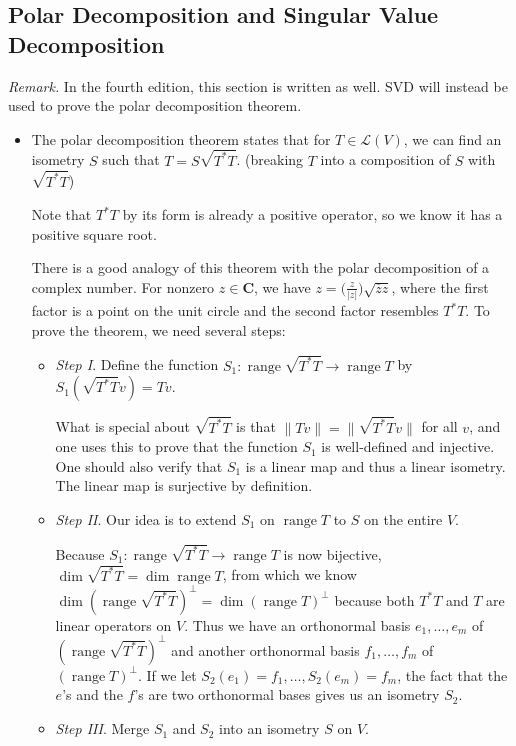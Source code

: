 \documentclass[11pt]{article}
\newcommand{\C}{\mathbf{C}}
\renewcommand{\r}{\operatorname{range}}
\renewcommand{\d}{\dim}
\newcommand{\conj}[1]{\overline{#1}}
\newcommand{\nm}[1]{\lVert #1 \rVert}
\newcommand{\abs}[1]{\lvert #1 \rvert}
\newcommand{\LV}{\mathcal{L}(V)}
\begin{document}
\subsection{Polar Decomposition and Singular Value Decomposition}
\textit{Remark.} In the fourth edition, this section is written as well. SVD will instead be used to prove the polar decomposition theorem.
\begin{itemize}
\item The polar decomposition theorem states that for $T \in \LV$, we can find an isometry $S$ such that $T = S \sqrt{T^*T}$. (breaking $T$ into a composition of $S$ with $\sqrt{T^*T}$)

Note that $T^*T$ by its form is already a positive operator, so we know it has a positive square root.

There is a good analogy of this theorem with the polar decomposition of a complex number. For nonzero $z \in \C$, we have $z = \bigl(\frac{z}{\abs{z}}\bigr)\sqrt{\conj{z}z}$, where the first factor is a point on the unit circle and the second factor resembles $T^*T$. To prove the theorem, we need several steps:
\begin{itemize}
    \item \textit{Step I}. Define the function $S_1: \r \sqrt{T^*T} \to \r T$ by $S_1(\sqrt{T^*T}v)=Tv$.
    
    What is special about $\sqrt{T^*T}$ is that $\nm{Tv}=\nm{\sqrt{T^*T}v}$ for all $v$, and one uses this to prove that the function $S_1$ is well-defined and injective. One should also verify that $S_1$ is a linear map and thus a linear isometry. The linear map is surjective by definition.
    
    \item \textit{Step II}. Our idea is to extend $S_1$ on $\r T$ to $S$ on the entire $V$. 
    
    Because $S_1: \r \sqrt{T^*T} \to \r T$ is now bijective, $\d \sqrt{T^*T} = \d \r T$, from which we know $\d(\r \sqrt{T^*T})^\perp = \d(\r T)^\perp$ because both $T^*T$ and $T$ are linear operators on $V$. Thus we have an orthonormal basis $e_1,\dots,e_m$ of $(\r \sqrt{T^*T})^\perp$ and another orthonormal basis $f_1,\dots,f_m$ of $(\r T)^\perp$. If we let $S_2(e_1) = f_1,\dots,S_2(e_m)=f_m$, the fact that the $e$'s and the $f$'s are two orthonormal bases gives us an isometry $S_2$.
    
    \item \textit{Step III}. Merge $S_1$ and $S_2$ into an isometry $S$ on $V$.
    

\end{itemize}
\end{itemize}
\end{document}
